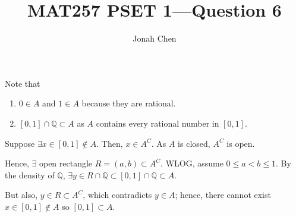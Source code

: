 \documentclass[a4paper]{article}
\title{MAT257 PSET 1---Question 6}
\author{Jonah Chen}
\numberwithin{equation}{section}
\begin{document}
\sffamily
\noindent Note that 
\begin{enumerate}
    \item $0\in A$ and $1\in A$ because they are rational. 
    \item $[0,1]\cap\mathbb Q\subset A$ as $A$ contains every rational number in $[0,1]$.
\end{enumerate}
Suppose $\exists x\in[0,1]\notin A$. Then, $x\in A^C$. As $A$ is closed, $A^C$ is open. 

\noindent Hence, $\exists$ open rectangle $R=(a,b)\subset A^C$. WLOG, assume $0\leq a<b\leq 1$. By the density of $\mathbb Q$, $\exists y\in R\cap\mathbb Q\subset [0,1]\cap\mathbb Q\subset A$. 

\noindent But also, $y\in R\subset A^C$, which contradicts $y\in A$; hence, there cannot exist $x\in[0,1]\notin A$ so $[0,1]\subset A$.  
\end{document}
